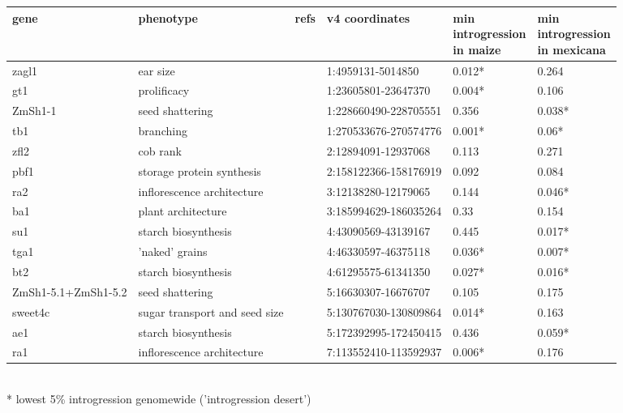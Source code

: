 \begin{sidewaystable}[p]
\centering
\begin{tabular}{llllll}
  \hline
gene & phenotype & refs & v4 coordinates & \makecell{min\\ introgression
\\ in maize} & \makecell{min\\ introgression\\
 in mexicana} \\ 
  \hline
zagl1 & ear size & \cite{Wills:2018_zagl1} & 1:4959131-5014850 & 0.012* & 0.264 \\ 
  gt1 & prolificacy & \cite{Wills:2013_gt1} & 1:23605801-23647370 & 0.004* & 0.106 \\ 
  ZmSh1-1 & seed shattering & \cite{Lin:2012_shattering} & 1:228660490-228705551 & 0.356 & 0.038* \\ 
  tb1 & branching & \cite{Doebley_Stec_Gustus:1995_tb1, Doebley_Stec_Hubbard:1997_tb1, Dong:2019_reg_domestication} & 1:270533676-270574776 & 0.001* & 0.06* \\ 
  zfl2 & cob rank  & \cite{Doebley_Stec:1991, Doebley_Stec:1993, Bomblies_Doebley:2006} & 2:12894091-12937068 & 0.113 & 0.271 \\ 
  pbf1 & storage protein synthesis & \cite{Wang:1998_pbf} & 2:158122366-158176919 & 0.092 & 0.084 \\ 
  ra2 & inflorescence architecture & \cite{Vollbrecht:2005_ramosa} & 3:12138280-12179065 & 0.144 & 0.046* \\ 
  ba1 & plant architecture & \cite{Gallavotti:2004_ba1} & 3:185994629-186035264 & 0.33 & 0.154 \\ 
  su1 & starch biosynthesis & \cite{Whitt:2002_starch} & 4:43090569-43139167 & 0.445 & 0.017* \\ 
  tga1 & 'naked' grains & \cite{Dorweiler:1993, Wang:2005_tga1} & 4:46330597-46375118 & 0.036* & 0.007* \\ 
  bt2 & starch biosynthesis & \cite{Whitt:2002_starch} & 4:61295575-61341350 & 0.027* & 0.016* \\ 
  ZmSh1-5.1+ZmSh1-5.2 & seed shattering & \cite{Lin:2012_shattering} & 5:16630307-16676707 & 0.105 & 0.175 \\ 
  sweet4c & sugar transport and seed size & \cite{Sosso:2015} & 5:130767030-130809864 & 0.014* & 0.163 \\ 
  ae1 & starch biosynthesis & \cite{Whitt:2002_starch} & 5:172392995-172450415 & 0.436 & 0.059* \\ 
  ra1 & inflorescence architecture & \cite{Vollbrecht:2005_ramosa, Sigmon_Vollbrecht:2010} & 7:113552410-113592937 & 0.006* & 0.176 \\ 
   \hline
\end{tabular}
\\
 * lowest 5\% introgression genomewide ('introgression desert')
\end{sidewaystable}

